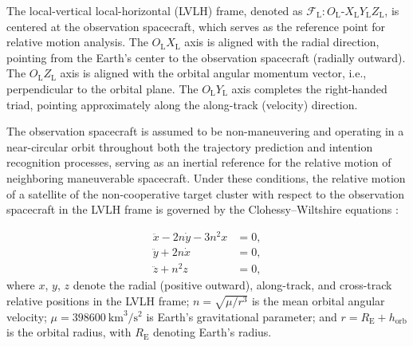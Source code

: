\documentclass[a4paper,fleqn]{cas-dc}
\begin{document}
The local-vertical local-horizontal (LVLH) frame, denoted as $\mathcal{F}_{\mathrm{L}}: O_{\mathrm{L}}\text{-}X_{\mathrm{L}}Y_{\mathrm{L}}Z_{\mathrm{L}}$, is centered at the observation spacecraft, which serves as the reference point for relative motion analysis. The $O_{\mathrm{L}}X_{\mathrm{L}}$ axis is aligned with the radial direction, pointing from the Earth's center to the observation spacecraft (radially outward). The $O_{\mathrm{L}}Z_{\mathrm{L}}$ axis is aligned with the orbital angular momentum vector, i.e., perpendicular to the orbital plane. The $O_{\mathrm{L}}Y_{\mathrm{L}}$ axis completes the right-handed triad, pointing approximately along the along-track (velocity) direction.

The observation spacecraft is assumed to be non-maneuvering and operating in a near-circular orbit throughout both the trajectory prediction and intention recognition processes, serving as an inertial reference for the relative motion of neighboring maneuverable spacecraft. Under these conditions, the relative motion of a satellite of the non-cooperative target cluster with respect to the observation spacecraft in the LVLH frame is governed by the Clohessy--Wiltshire equations \cite{clohessy1960terminal}:

\begin{align}
    \ddot{x} - 2n\dot{y} - 3n^2 x & = 0, \label{eq:cw_x} \\
    \ddot{y} + 2n\dot{x}          & = 0, \label{eq:cw_y} \\
    \ddot{z} + n^2 z              & = 0, \label{eq:cw_z}
\end{align}
where $x$, $y$, $z$ denote the radial (positive outward), along-track, and cross-track relative positions in the LVLH frame; $n = \sqrt{\mu / r^3}$ is the mean orbital angular velocity; $\mu = 398600\ \text{km}^3/\text{s}^2$ is Earth's gravitational parameter; and $r = R_{\mathrm{E}} + h_{\text{orb}}$ is the orbital radius, with $R_{\mathrm{E}}$ denoting Earth's radius.
\end{document}

